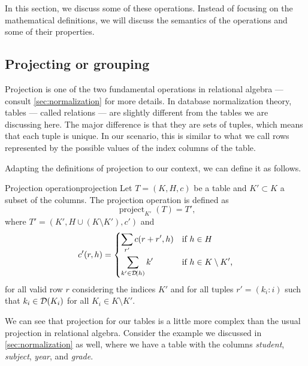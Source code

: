 In this section, we discuss some of these operations.  Instead of focusing on the
mathematical definitions, we will discuss the semantics of the operations and some
of their properties.

\subsection{Projecting or grouping}
\label{sub:projection}

Projection is one of the two fundamental operations in relational algebra --- consult
\cref{sec:normalization} for more details.  In database normalization theory, tables ---
called relations --- are slightly different from the tables we are discussing here. The
major difference is that they are sets of tuples, which means that each tuple is unique.
In our scenario, this is similar to what we call rows represented by the possible values
of the index columns of the table.

Adapting the definitions of projection to our context, we can define it as follows.

\begin{defbox}{Projection operation}{projection}
  Let $T = (K, H, c)$ be a table and $K' \subset K$ a subset of the columns.  The
  projection operation is defined as \[
    \operatorname{project}_{K'}(T) = T'\text{,}
  \] where $T' = (K', H \cup (K \setminus K'), c')$ and \[
    c'(r, h) = \begin{dcases}
      \sum_{r'} c(r + r', h) & \text{if } h \in H \\
      \sum_{k' \in \mathcal{D}\!\left(h\right)} k' & \text{if } h \in K \setminus K'\text{,}
    \end{dcases}
  \] for all valid row $r$ considering the indices $K'$ and for all tuples $r' = (k_i :
  i)$ such that $k_i \in \mathcal{D}\!\left(K_i\right)$ for all $K_i \in K \setminus K'$.
\end{defbox}

We can see that projection for our tables is a little more complex than the usual
projection in relational algebra.  Consider the example we discussed in
\cref{sec:normalization} as well, where we have a table with the columns \emph{student},
\emph{subject}, \emph{year}, and \emph{grade}.

